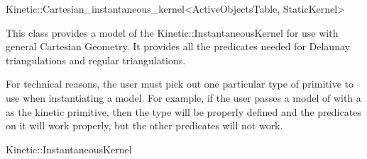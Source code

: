 

\begin{ccRefClass}{Kinetic::Cartesian_instantaneous_kernel<ActiveObjectsTable, StaticKernel>}  %


\ccDefinition
  
This class provides a model of the Kinetic::InstantaneousKernel for
use with general Cartesian Geometry. It provides all the predicates
needed for Delaunay triangulations and regular triangulations.

For technical reasons, the user must pick out one particular type of
primitive to use when instantiating a model. For example, if the user
passes a model of  with a
 as the kinetic primitive, then the type
 will be properly defined and the predicates on it will
work properly, but the other predicates will not work.


\ccIsModel

Kinetic::InstantaneousKernel

\end{ccRefClass}



